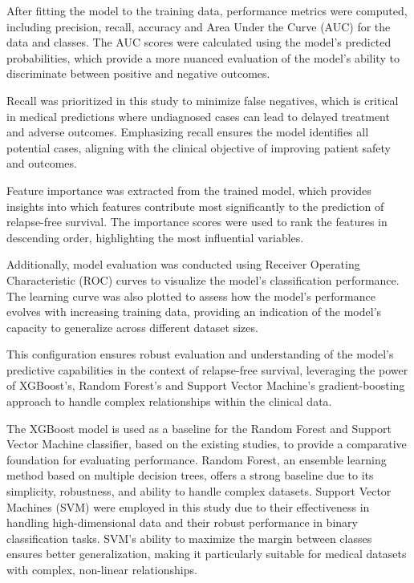\documentclass[conference]{IEEEtran}
\begin{document}
After fitting the model to the training data, performance metrics were computed, including precision, recall, accuracy and Area Under the Curve (AUC) for the data and classes. The AUC scores were calculated using the model's predicted probabilities, which provide a more nuanced evaluation of the model's ability to discriminate between positive and negative outcomes.

Recall was prioritized in this study to minimize false negatives, which is critical in medical predictions where undiagnosed cases can lead to delayed treatment and adverse outcomes. Emphasizing recall ensures the model identifies all potential cases, aligning with the clinical objective of improving patient safety and outcomes.

Feature importance was extracted from the trained model, which provides insights into which features contribute most significantly to the prediction of relapse-free survival. The importance scores were used to rank the features in descending order, highlighting the most influential variables.

Additionally, model evaluation was conducted using Receiver Operating Characteristic (ROC) curves to visualize the model's classification performance. The learning curve was also plotted to assess how the model's performance evolves with increasing training data, providing an indication of the model’s capacity to generalize across different dataset sizes.

This configuration ensures robust evaluation and understanding of the model's predictive capabilities in the context of relapse-free survival, leveraging the power of XGBoost's, Random Forest's and Support Vector Machine's gradient-boosting approach to handle complex relationships within the clinical data.

The XGBoost model is used as a baseline for the Random Forest and Support Vector Machine classifier, based on the existing studies, to provide a comparative foundation for evaluating performance. Random Forest, an ensemble learning method based on multiple decision trees, offers a strong baseline due to its simplicity, robustness, and ability to handle complex datasets. Support Vector Machines (SVM) were employed in this study due to their effectiveness in handling high-dimensional data and their robust performance in binary classification tasks. SVM's ability to maximize the margin between classes ensures better generalization, making it particularly suitable for medical datasets with complex, non-linear relationships.
\end{document}
